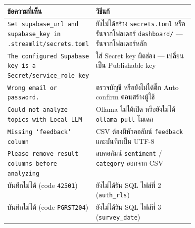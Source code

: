 \documentclass[11pt,a4paper]{article}
\newcommand{\file}[1]{\texttt{#1}}
\begin{document}
\begin{center}\small
\begin{tabularx}{\linewidth}{@{}>{\raggedright\arraybackslash}p{0.44\linewidth} >{\raggedright\arraybackslash}X@{}}
\toprule
\textbf{ข้อความที่เห็น} & \textbf{วิธีแก้} \\
\midrule
\texttt{Set supabase\_url and supabase\_key in .streamlit/secrets.toml}
  & ยังไม่ได้สร้าง \file{secrets.toml} หรือรันจากโฟลเดอร์ \file{dashboard/} — รันจากโฟลเดอร์หลัก \\\addlinespace[3pt]
\texttt{The configured Supabase key is a Secret/service\_role key}
  & ใส่ Secret key ผิดช่อง — เปลี่ยนเป็น Publishable key \\\addlinespace[3pt]
\texttt{Wrong email or password.}
  & ตรวจบัญชี หรือยังไม่ได้ติ๊ก Auto confirm ตอนสร้างผู้ใช้ \\\addlinespace[3pt]
\texttt{Could not analyze topics with Local LLM}
  & Ollama ไม่ได้เปิด หรือยังไม่ได้ \texttt{ollama pull} โมเดล \\\addlinespace[3pt]
\texttt{Missing `feedback` column}
  & CSV ต้องมีหัวคอลัมน์ \file{feedback} และบันทึกเป็น UTF-8 \\\addlinespace[3pt]
\texttt{Please remove result columns before analyzing}
  & ลบคอลัมน์ \file{sentiment} / \file{category} ออกจาก CSV \\\addlinespace[3pt]
บันทึกไม่ได้ (code \texttt{42501})
  & ยังไม่ได้รัน SQL ไฟล์ที่ 2 (\file{auth\_rls}) \\\addlinespace[3pt]
บันทึกไม่ได้ (code \texttt{PGRST204})
  & ยังไม่ได้รัน SQL ไฟล์ที่ 3 (\file{survey\_date}) \\
\bottomrule
\end{tabularx}
\end{center}
\end{document}
